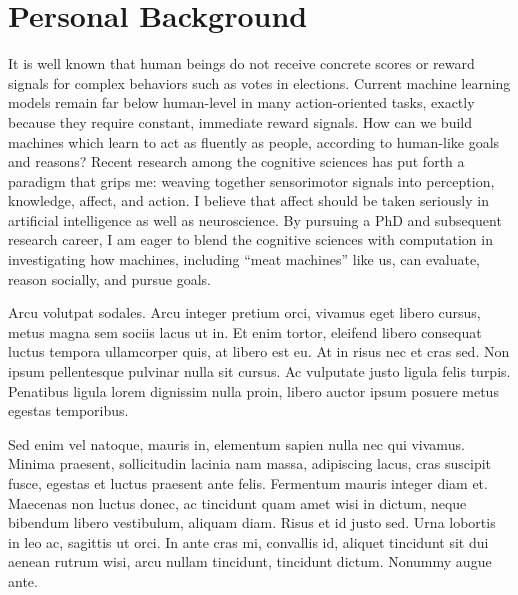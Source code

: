 \section*{Personal Background}

\begin{singlespace}
\bi
It is well known that human beings do not receive concrete scores
or reward signals for complex behaviors such as votes in elections.
Current machine learning models remain far below human-level in many
action-oriented tasks, exactly because they require constant, immediate
reward signals\cite{Lake2016}. How can we build machines which learn
to act as fluently as people, according to human-like goals and reasons\cite{Lake2016,Railton2017}?
Recent research among the cognitive sciences has put forth a paradigm
that grips me: weaving together sensorimotor signals into perception,
knowledge, affect, and action\cite{probmods,Clark2013}. I believe
that affect should be taken seriously in artificial intelligence as
well as neuroscience. By pursuing a PhD and subsequent research career,
I am eager to blend the cognitive sciences with computation in investigating
how machines, including ``meat machines'' like us, can evaluate,
reason socially, and pursue goals.
\end{singlespace}

\begin{singlespace}
Arcu volutpat sodales.
Arcu integer pretium orci, vivamus eget libero cursus, metus magna sem sociis lacus ut in.
Et enim tortor, eleifend libero consequat luctus tempora ullamcorper quis, at libero est eu.
At in risus nec et cras sed.
Non ipsum pellentesque pulvinar nulla sit cursus.
Ac vulputate justo ligula felis turpis.
Penatibus ligula lorem dignissim nulla proin, libero auctor ipsum posuere metus egestas temporibus.
\end{singlespace}

\begin{singlespace}
Sed enim vel natoque, mauris in, elementum sapien nulla nec qui vivamus.
Minima praesent, sollicitudin lacinia nam massa, adipiscing lacus, cras suscipit fusce, egestas et luctus praesent ante felis.
Fermentum mauris integer diam et.
Maecenas non luctus donec, ac tincidunt quam amet wisi in dictum, neque bibendum libero vestibulum, aliquam diam.
Risus et id justo sed.
Urna lobortis in leo ac, sagittis ut orci.
In ante cras mi, convallis id, aliquet tincidunt sit dui aenean rutrum wisi, arcu nullam tincidunt, tincidunt dictum.
Nonummy augue ante.
\end{singlespace}
